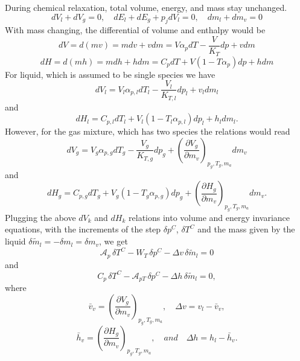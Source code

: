 During chemical relaxation, total volume, energy, and mass stay unchanged.
\begin{equation}
dV_l+dV_g=0, \quad dE_l+dE_g+p_{j}dV_l=0, \quad dm_l+dm_v=0 
\end{equation}
With mass changing, the differential of volume and enthalpy would be
\begin{equation}
dV = d(mv) = mdv + vdm = V \alpha_p dT - \frac{V}{K_T} dp + vdm
\end{equation}
\begin{equation}
dH = d(mh) = mdh + hdm = C_p dT + V \left( 1 - T \alpha_p \right) dp + hdm
\end{equation}
For liquid, which is assumed to be single species we have
\begin{equation}
dV_l = V_l \alpha_{p,l} dT_l - \frac{V_l}{K_{T,l}} dp_l + v_ldm_l
\end{equation}
and
\begin{equation}
dH_l = C_{p,l} dT_l + V_l \left( 1 - T_l \alpha_{p,l} \right) dp_l + h_ldm_l.
\end{equation}
However, for the gas mixture, which has two species the relations would read
\begin{equation}
dV_g = V_g \alpha_{p,g} dT_g - \frac{V_g}{K_{T,g}} dp_g + \left( \frac{\partial V_g}{\partial m_v} \right)_{p_g,T_g,m_a} dm_v
\end{equation}
and
\begin{equation}
dH_g = C_{p,g} dT_g + V_g \left( 1 - T_g \alpha_{p,g} \right) dp_g + \left( \frac{\partial H_g}{\partial m_v} \right)_{p_g,T_g,m_a} dm_v.
\end{equation}
Plugging the above $dV_k$ and $dH_k$ relations into volume and energy invariance equations, with the increments of the step $\delta p^C$, $\delta T^C$ and the mass given by the liquid $\delta\tilde{m}_l=-\delta m_l=\delta m_v$, we get
\begin{equation}
\mathcal{A}_p \,\delta T^C - W_T \,\delta p^C - \Delta v \,\delta\tilde{m}_l = 0
\end{equation}
and
\begin{equation}
C_p \,\delta T^C - \mathcal{A}_{pT} \,\delta p^C - \Delta h \,\delta\tilde{m}_l = 0,
\end{equation}
where
\begin{equation}
\bar{v}_v = \left( \frac{\partial V_g}{\partial m_v} \right)_{p_g,T_g,m_a}, \quad \Delta v = v_l - \bar{v}_v,
\end{equation}
\begin{equation}
\bar{h}_v = \left( \frac{\partial H_g}{\partial m_v} \right)_{p_g,T_g,m_a}, \quad and \quad \Delta h = h_l - \bar{h}_v.
\end{equation}
